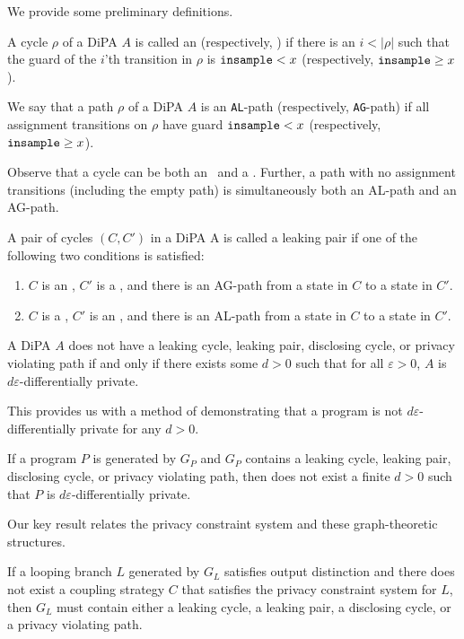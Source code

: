 We provide some preliminary definitions. 
\begin{defn}
    A cycle $\rho$ of a DiPA $A$ is called an \lcycle (respectively, \gcycle) if there is an $i< |\rho|$ such that the guard of the $i$'th transition in $\rho$ is $\texttt{insample} < x$ (respectively, $\texttt{insample}\geq x$).

    We say that a path $\rho$ of a DiPA $A$ is an \texttt{AL}-path (respectively, \texttt{AG}-path) if all assignment transitions on $\rho$ have guard $\texttt{insample} < x$ (respectively, $\texttt{insample}\geq x$).

    Observe that a cycle can be both an \lcycle~and a \gcycle.
    Further, a path with no assignment transitions (including the empty path) is simultaneously both an AL-path and an AG-path.
\end{defn} 
\begin{defn}\label{defLeakingPairs}
    A pair of cycles $(C, C')$ in a DiPA A is called a leaking pair if one of the following two conditions is satisfied:
    \begin{enumerate}
        \item $C$ is an \lcycle, $C'$ is a \gcycle, and there is an AG-path
        from a state in $C$ to a state in $C'$.
        \item $C$ is a \gcycle, $C'$ is an \lcycle, and there is an AL-path
        from a state in $C$ to a state in $C'$.
    \end{enumerate}
\end{defn} 

\begin{thm}\label{DiPACounterexamplesThm}
    A DiPA $A$ does not have a leaking cycle, leaking pair, disclosing cycle, or privacy violating path if and only if there exists some $d>0$ such that for all $\varepsilon>0$, $A$ is $d\varepsilon$-differentially private. 
\end{thm}

This provides us with a method of demonstrating that a program is not $d\varepsilon$-differentially private for any $d>0$.

\begin{cor}
    If a program $P$ is generated by $G_P$ and $G_P$ contains a leaking cycle, leaking pair, disclosing cycle, or privacy violating path, then does not exist a finite $d>0$ such that $P$ is $d\varepsilon$-differentially private. 
\end{cor}

Our key result relates the privacy constraint system and these graph-theoretic structures.

\begin{lemma}
    If a looping branch $L$ generated by $G_L$ satisfies output distinction and there does not exist a coupling strategy $C$ that satisfies the privacy constraint system for $L$, then $G_L$ must contain either a leaking cycle, a leaking pair, a disclosing cycle, or a privacy violating path. 
\end{lemma}